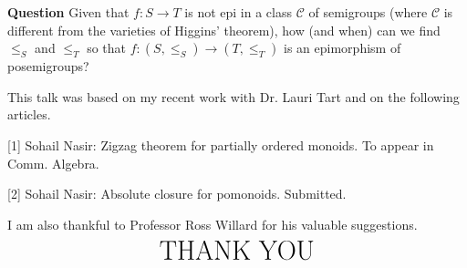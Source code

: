 \documentclass[notes=show]{beamer}
\begin{document}
\begin{frame}%


\textbf{Question} Given that $f:S\longrightarrow T$ is not epi in a class $%
\mathcal{C}$ of semigroups (where $\mathcal{C}$ is different from the
varieties of Higgins' theorem), how (and when) can we find $\leq _{S}$ and $%
\leq _{T}$ so that $f:(S,\leq _{S})\longrightarrow (T,\leq _{T})$ is an
epimorphism of posemigroups?

\transboxout%
\end{frame}%

\begin{frame}%


This talk was based on my recent work with Dr. Lauri Tart and on the
following articles.\bigskip

[1] Sohail Nasir: Zigzag theorem for partially ordered monoids. To appear in
Comm. Algebra.\medskip

[2] Sohail Nasir: Absolute closure for pomonoids. Submitted.\bigskip 

I am also thankful to Professor Ross Willard for his valuable
suggestions.\bigskip 
\begin{equation*}
\text{{\huge THANK YOU}}
\end{equation*}

\transboxout%
\end{frame}%
\end{document}
